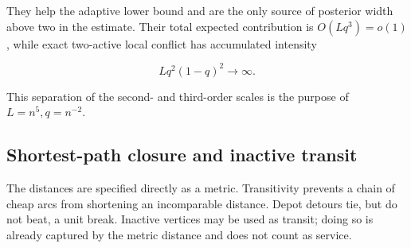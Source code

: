 \documentclass[11pt,a4paper]{article}
\begin{document}
They help the adaptive lower bound and are the only source of posterior width above two in the estimate.  Their total expected contribution is \(O(Lq^3)=o(1)\), while exact two-active local conflict has accumulated intensity


\[
                         Lq^2(1-q)^2\to\infty.
\]

This separation of the second- and third-order scales is the purpose of \(L=n^5,q=n^{-2}\).


\subsection*{Shortest-path closure and inactive transit}

The distances are specified directly as a metric.  Transitivity prevents a chain of cheap arcs from shortening an incomparable distance.  Depot detours tie, but do not beat, a unit break.  Inactive vertices may be used as transit; doing so is already captured by the metric distance and does not count as service.
\end{document}
